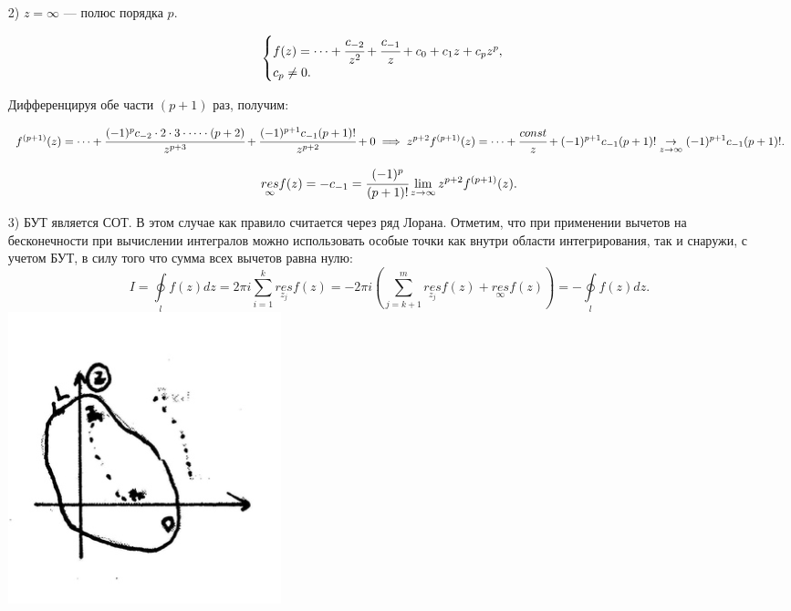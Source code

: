 \documentclass[../../main.tex]{subfiles}
\begin{document}
\begin{itemize}
\begin{itemize}
	 	\item[2)]
	 	$z=\infty$ --- полюс порядка $p$.
	 	
	 	\[
	 	\begin{cases}
	 	f(z)=\dots+\cfrac{c_{-2}}{z^2}+\cfrac{c_{-1}}{z}+c_0+c_1z+c_pz^p,\\
	 	c_p\neq0.
	 	\end{cases}
	 	\]
	 	
	 	Дифференцируя обе части $(p+1)$ раз, получим:
	 	
	 	\[
	 	f^{(p+1)}(z)=\dots+\cfrac{(-1)^{p}c_{-2}\cdot2\cdot3\cdot\dots\cdot(p+2)}{z^{p+3}}+\cfrac{(-1)^{p+1}c_{-1}(p+1)!}{z^{p+2}}+0\implies
	 	z^{p+2}f^{(p+1)}(z)=\dots+\cfrac{const}{z}+(-1)^{p+1}c_{-1}(p+1)!\underset{z\rightarrow \infty}{\rightarrow}(-1)^{p+1}c_{-1}(p+1)!.
	 	\]
	 	
	 	\begin{equation}
	 	\underset{\infty}{res}f(z)=-c_{-1}=\cfrac{(-1)^p}{(p+1)!}\lim\limits_{z\rightarrow\infty}z^{p+2}f^{(p+1)}(z).
	 	\end{equation}
	 	
	 	\item[3)] 
	 	БУТ является СОТ. В этом случае как правило считается через ряд Лорана. Отметим, что при применении вычетов на бесконечности при вычислении интегралов можно использовать особые точки как внутри области интегрирования, так и снаружи, с учетом БУТ, в силу того что сумма всех вычетов равна нулю:
	 	\[
	 	I=\oint\limits_lf(z)dz=2\pi i \sum_{i=1}^{k}\underset{z_j}{res}f(z)=-2\pi i\left(\sum_{j=k+1}^{m}\underset{z_j}{res}f(z)+\underset{\infty}{res}f(z)
	 	\right)=-\oint\limits_lf(z)dz.
	 	\]
	 	\includegraphics{lec_27}
	 \end{itemize}
	 \end{itemize}
\end{document}
